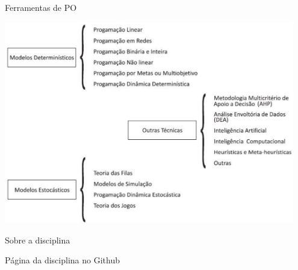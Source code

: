 \documentclass[compress]{beamer}
\begin{document}

\begin{frame}{Ferramentas de PO}

\includegraphics[width=0.95\textwidth]{images/ferramentas_po.png}

\end{frame}


\begin{frame}{Sobre a disciplina}

Página da disciplina no Github \href{https://github.com/iagoac/dce692}{}
\end{frame}
\end{document}
